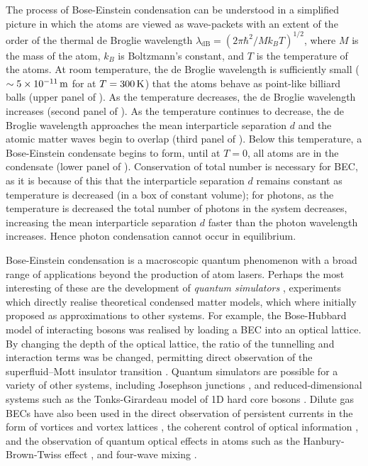 The process of Bose-Einstein condensation can be understood in a simplified picture in which the atoms are viewed as wave-packets with an extent of the order of the thermal de Broglie wavelength $\lambda_\text{dB} = (2 \pi \hbar^2 / M k_B T)^{1/2}$, where $M$ is the mass of the atom, $k_B$ is Boltzmann's constant, and $T$ is the temperature of the atoms.  At room temperature, the de Broglie wavelength is sufficiently small ($\sim 5\times\unit[10^{-11}]{m}$ for  at $T=\unit[300]{K}$) that the atoms behave as point-like billiard balls (upper panel of ).  As the temperature decreases, the de Broglie wavelength increases (second panel of ).  As the temperature continues to decrease, the de Broglie wavelength approaches the mean interparticle separation $d$ and the atomic matter waves begin to overlap (third panel of ).  Below this temperature, a Bose-Einstein condensate begins to form, until at $T=0$, all atoms are in the condensate (lower panel of ).  Conservation of total number is necessary for BEC, as it is because of this that the interparticle separation $d$ remains constant as temperature is decreased (in a box of constant volume); for photons, as the temperature is decreased the total number of photons in the system decreases, increasing the mean interparticle separation $d$ faster than the photon wavelength increases.  Hence photon condensation cannot occur in equilibrium.

Bose-Einstein condensation is a macroscopic quantum phenomenon with a broad range of applications beyond the production of atom lasers.  Perhaps the most interesting of these are the development of \emph{quantum simulators} \citep{Lewenstein:2007,Buluta:2009}, experiments which directly realise theoretical condensed matter models, which where initially proposed as approximations to other systems.  For example, the Bose-Hubbard model \citep{Fisher:1989} of interacting bosons was realised by loading a BEC into an optical lattice.  By changing the depth of the optical lattice, the ratio of the tunnelling and interaction terms was be changed, permitting direct observation of the superfluid--Mott insulator transition \citep{Greiner:2002lr}.  Quantum simulators are possible for a variety of other systems, including Josephson junctions \citep{Levy:2007vn}, and reduced-dimensional systems such as the Tonks-Girardeau model of 1D hard core bosons \citep{Girardeau:1960,Lieb:1963,Paredes:2004}.  Dilute gas BECs have also been used in the direct observation of persistent currents in the form of vortices and vortex lattices \citep{Abo-Shaeer:2001}, the coherent control of optical information \citep{Ginsberg:2007fk}, and the observation of quantum optical effects in atoms such as the Hanbury-Brown-Twiss effect \citep{Jeltes:2007fk}, and four-wave mixing \citep{Deng:1999qy}.

